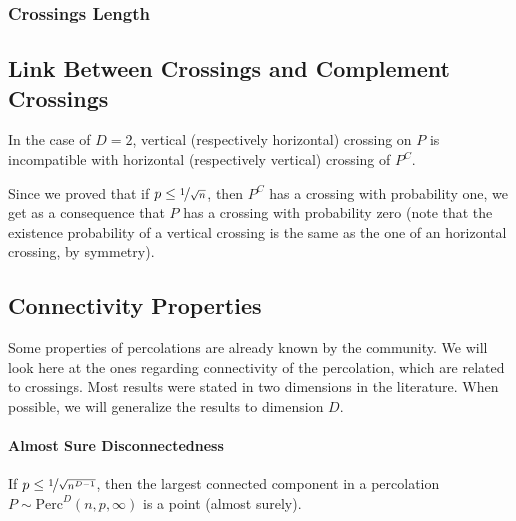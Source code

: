 \subsubsection{Crossings Length}


\subsection{Link Between Crossings and Complement Crossings}
In the case of $D=2$, vertical (respectively horizontal) crossing on $P$ is incompatible with horizontal (respectively vertical) crossing of $P^C$.

Since we proved that if $p \leq \nicefrac{1}{\sqrt{n}}$, then $P^C$ has a crossing with probability one, we get as a consequence that $P$ has a crossing with probability zero (note that the existence probability of a vertical crossing is the same as the one of an horizontal crossing, by symmetry).

\subsection{Connectivity Properties}
Some properties of percolations are already known by the community.
We will look here at the ones regarding connectivity of the percolation, which are related to crossings.
Most results were stated in two dimensions in the literature.
When possible, we will generalize the results to dimension $D$.

\paragraph{Almost Sure Disconnectedness}
If $p \leq \nicefrac{1}{\sqrt{n^{D-1}}}$, then the largest connected component in a percolation $P \sim \text{Perc}^D(n,p,\infty)$ is a point (almost surely).

